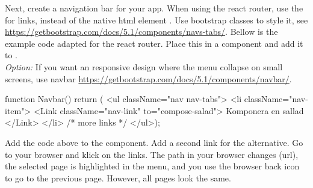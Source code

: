 \documentclass[fleqn, article, a4paper]{memoir}
\begin{document}
\begin{Assignments}
\item Next, create a navigation bar for your app. When using the react router, use the  for links, instead of the native html element . Use bootstrap classes to style it, see \url{https://getbootstrap.com/docs/5.1/components/navs-tabs/}. Bellow is the example code adapted for the react router. Place this in a  component and add it to .
\\ \emph{Option:} If you want an responsive design where the menu collapse on small screens, use navbar \url{https://getbootstrap.com/docs/5.1/components/navbar/}.

\begin{Code}
function Navbar() {
  return (
  <ul className="nav nav-tabs">
    <li className="nav-item">
      <Link className="nav-link" to="compose-salad">
        Komponera en sallad
      </Link>
    </li>
    {/* more links */}
  </ul>);
}
\end{Code}
Add the code above to the  component. Add a second link for the  alternative. Go to your browser and klick on the links. The path in your browser changes (url), the selected page is highlighted in the menu, and you use the browser back icon to go to the previous page. However, all pages look the same.


\end{Assignments}
\end{document}
